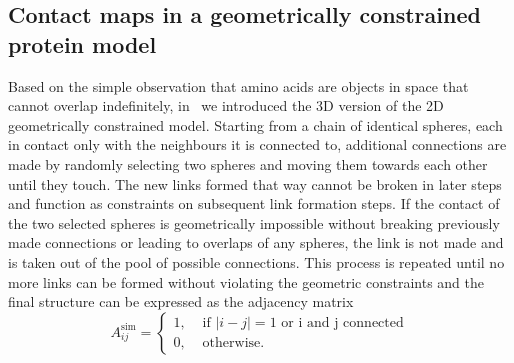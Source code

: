 \documentclass[10pt]{iopart}
\begin{document}
\subsection{Contact maps in a geometrically constrained protein model}

Based on the simple observation that amino acids are objects in space that cannot overlap indefinitely, in~\cite{molkenthin2020self} we introduced the 3D version of the 2D geometrically constrained model. Starting from a chain of identical spheres, each in contact only with the neighbours it is connected to, additional connections are made by randomly selecting two spheres and moving them towards each other until they touch. The new links formed that way cannot be broken in later steps and function as constraints on subsequent link formation steps. If the contact of the two selected spheres is geometrically impossible without breaking previously made connections or leading to overlaps of any spheres, the link is not made and is taken out of the pool of possible connections. This process is repeated until no more links can be formed without violating the geometric constraints and the final structure can be expressed as the adjacency matrix
\begin{equation}
  A^{\mathrm{sim}}_{ij}=
  \begin{cases}
   1, & \text{ if }|i-j|=1 \text{ or i and j connected} \\
      0, & \text{ otherwise}.
      \end{cases}
    \label{eq:sim_aij}
\end{equation}


\end{document}
